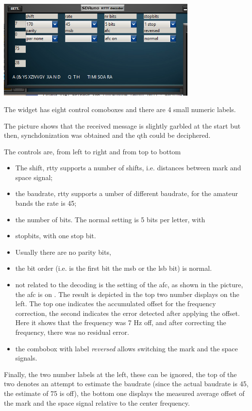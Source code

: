 \documentclass[11pt]{article}
\begin{document}
\includegraphics[width=100mm]{rtty-plugin-widget.png}

The widget has eight control comoboxes and there are 4 small numeric
labels.

The picture shows that the received message is slightly garbled at the start
but then, synchdonization was obtained and the qth could be deciphered.

The controls are, from left to right and from top to bottom
\begin{itemize}
\item The shift, rtty supports a number of shifts, i.e. distances
between mark and space signal;
\item the baudrate, rtty supports a  umber of different baudrate,
for the amateur bands the rate is 45;
\item the number of bits. The normal setting is 5 bits per letter, with
\item stopbits, with one stop bit.
\item Usually there are no parity bits,
\item the bit order (i.e. is the first bit the msb or the lsb bit) is
normal.
\item not related to the decoding is the setting of the afc, as shown in the
picture, the afc is on . The result is depicted in the top two number
displays on the left. The top one indicates the accumulated offset
for the frequency correction, the second indicates the error detected
after applying the offset. Here it shows that the frequency was 7 Hz off, and
after correcting the frequency, there was no residual error.
\item the combobox with label {\em reversed} allows switching the
mark and the space signals.
\end{itemize}

Finally, the two number labels at the left, these can be ignored, the
top of the two denotes an attempt to estimate the baudrate (since the
actual baudrate is 45, the estimate of 75 is off), the bottom one
displays the measured average offset of the mark and the space signal
relative to the center frequency.
\end{document}
